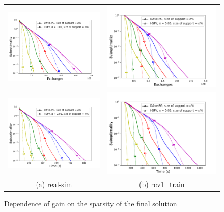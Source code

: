 \begin{figure}[b!]
\begin{tabular}{cc}
\includegraphics[width = 0.49\linewidth]{SODA/Figs/real-sim_20w_diff_sp_fun_vs_ex_log.pdf}&
\includegraphics[width = 0.49\linewidth]{SODA/Figs/rcv1_train_20w_diff_sp_fun_vs_ex_log.pdf}\\%
\includegraphics[width = 0.49\linewidth]{SODA/Figs/real-sim_20w_diff_sp_fun_vs_time_log.pdf}&
\includegraphics[width = 0.49\linewidth]{SODA/Figs/rcv1_train_20w_diff_sp_fun_vs_time_log.pdf}\\%
(a) real-sim & (b) rcv1\_train
\end{tabular}
\caption{Dependence of gain on the sparsity of the final solution}
\label{fig:different_final_sparsity}
\end{figure}
